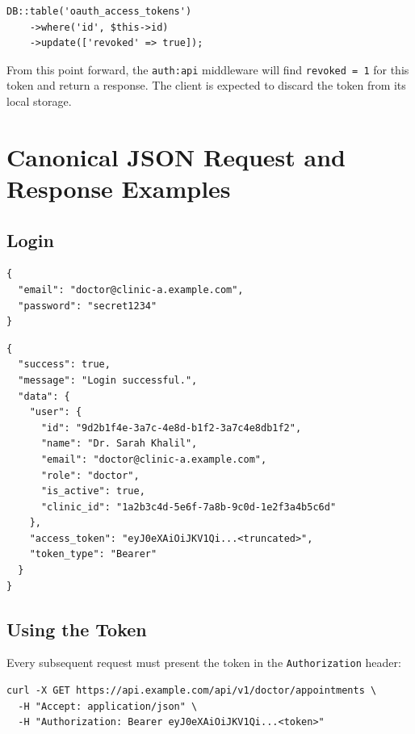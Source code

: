 \begin{lstlisting}[style=php, caption={Passport's internal revocation update.}]
DB::table('oauth_access_tokens')
    ->where('id', $this->id)
    ->update(['revoked' => true]);
\end{lstlisting}

From this point forward, the \texttt{auth:api} middleware will find
\texttt{revoked = 1} for this token and return a \stunauth{} response.
The client is expected to discard the token from its local storage.

\section{Canonical JSON Request and Response Examples}
\label{sec:auth-examples}

\subsection{Login}

\begin{lstlisting}[style=json, caption={Request: \texttt{POST
  /api/\apiversion{}/auth/login}.}]
{
  "email": "doctor@clinic-a.example.com",
  "password": "secret1234"
}
\end{lstlisting}

\begin{lstlisting}[style=json, caption={Response: HTTP 200 OK on
  successful authentication.}]
{
  "success": true,
  "message": "Login successful.",
  "data": {
    "user": {
      "id": "9d2b1f4e-3a7c-4e8d-b1f2-3a7c4e8db1f2",
      "name": "Dr. Sarah Khalil",
      "email": "doctor@clinic-a.example.com",
      "role": "doctor",
      "is_active": true,
      "clinic_id": "1a2b3c4d-5e6f-7a8b-9c0d-1e2f3a4b5c6d"
    },
    "access_token": "eyJ0eXAiOiJKV1Qi...<truncated>",
    "token_type": "Bearer"
  }
}
\end{lstlisting}

\subsection{Using the Token}

Every subsequent request must present the token in the
\texttt{Authorization} header:

\begin{lstlisting}[style=bash, caption={Bearer token usage in a curl request.}]
curl -X GET https://api.example.com/api/v1/doctor/appointments \
  -H "Accept: application/json" \
  -H "Authorization: Bearer eyJ0eXAiOiJKV1Qi...<token>"
\end{lstlisting}


